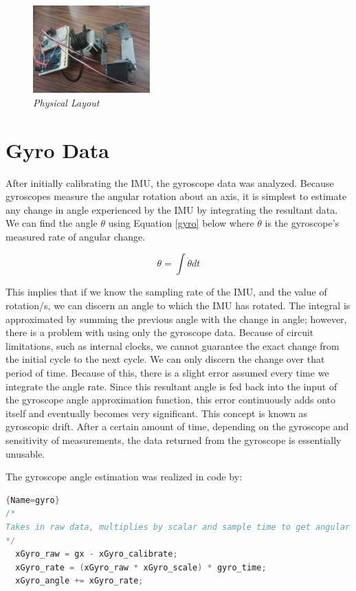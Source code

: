 \documentclass{IEEEtran}
\begin{document}
\begin{figure}[ht!]
    \centering
    \includegraphics[width=0.4\textwidth]{physical}
    \caption{\emph{Physical Layout}}
    \label{physicalPIC}
\end{figure}


\section{Gyro Data}
After initially calibrating the IMU, the gyroscope data was analyzed. Because gyroscopes measure the angular rotation about an axis, it is simplest to estimate any change in angle experienced by the IMU by integrating the resultant data. We can find the angle $\theta$ using Equation \ref{gyro} below where $\dot{\theta}$ is the gyroscope's measured rate of angular change.


\begin{equation} 
\label{gyro}
\theta=\int{\dot{\theta}}dt
\end{equation}

This implies that if we know the sampling rate of the IMU, and the value of rotation/s, we can discern an angle to which the IMU has rotated. The integral is approximated by summing the previous angle with the change in angle; however, there is a problem with using only the gyroscope data. Because of circuit limitations, such as internal clocks, we cannot guarantee the exact change from the initial cycle to the next cycle. We can only discern the change over that period of time. Because of this, there is a slight error assumed every time we integrate the angle rate. Since this resultant angle is fed back into the input of the gyroscope angle approximation function, this error continuously adds onto itself and eventually becomes very significant. This concept is known as gyroscopic drift. After a certain amount of time, depending on the gyroscope and sensitivity of measurements, the data returned from the gyroscope is essentially unusable.

The gyroscope angle estimation was realized in code by:
\begin{lstlisting}[language=C++]{Name=gyro}
/*
Takes in raw data, multiplies by scalar and sample time to get angular rate, and adds to previous angle, where gx is the gyroscope data.
*/
  xGyro_raw = gx - xGyro_calibrate;
  xGyro_rate = (xGyro_raw * xGyro_scale) * gyro_time;
  xGyro_angle += xGyro_rate;
\end{lstlisting}
\end{document}
